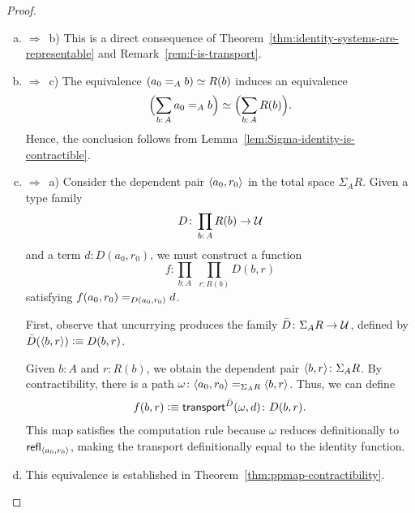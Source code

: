 \begin{proof}\ 
    \begin{enumerate}[a),font=\upshape]
        \item $\Rightarrow$~b) This is a direct consequence of Theorem~\ref{thm:identity-systems-are-representable} and Remark~\ref{rem:f-is-transport}.

        \item $\Rightarrow$~c) The equivalence $(a_0\mathrel{=_{A}}b)\simeq R(b)$ induces an equivalence
        \[
            \Bigl(\sum_{b\colon A}a_0\eq{A}b\Bigr)
            \simeq
            \Bigl(\sum_{b\colon A}R(b)\Bigr).
        \]
        Hence, the conclusion follows from Lemma~\ref{lem:Sigma-identity-is-contractible}.

        \item $\Rightarrow$~a) Consider the dependent pair $\langle a_0,r_0\rangle$ in the total space $\Sigma_AR$. Given a type family
        \[
            D\colon\prod_{b\colon A}R(b)\to\univ
        \]
        and a term $d\colon D(a_0,r_0)$, we must construct a function
        \[
            f\colon\prod_{b\colon A}\;
                \prod_{r\colon R(b)}D(b,r)
        \]
        satisfying $f(a_0,r_0)\mathrel{=_{D(a_0,r_0)}}d$.
        
        First, observe that uncurrying produces the family $\bar{D}\colon\Sigma_AR\to\univ$, defined by $\bar{D}(\langle b,r\rangle)\mathrel{\vcentcolon}\equiv D(b,r)$. 
        
        Given $b\colon A$ and $r\colon R(b)$, we obtain the dependent pair $\dep{b,r}\colon\Sigma_AR$. By contractibility, there is a path $\omega\colon\dep{a_0,r_0}\eq{\Sigma_AR}\dep{b,r}$. Thus, we can define
        \[
            f(b,r)\defeq
                \fun{transport}^{\bar{D}}(\omega,d)
                \colon D(b,r).
        \]
        This map satisfies the computation rule because $\omega$ reduces definitionally to $\mathsf{refl}_{\langle a_0,r_0\rangle}$, making the transport definitionally equal to the identity function.

        \item[a) $\Leftrightarrow$~d)] This equivalence is established in Theorem~\ref{thm:ppmap-contractibility}.
    \end{enumerate}
\end{proof}

